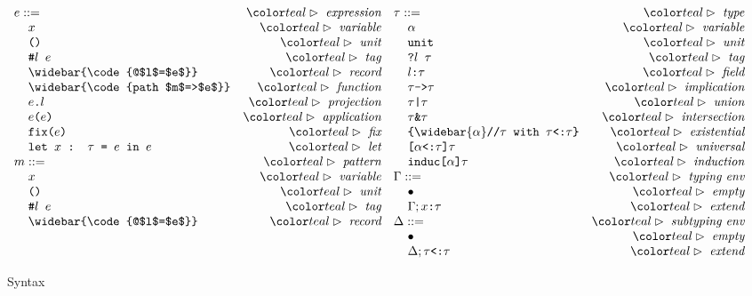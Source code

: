 \documentclass[acmsmall]{acmart}
\begin{document}
\begin{figure*}[h]
\[
\begin{array}[t]{l r}
  e ::= &\C{expression}
  \\
  \I \code{$x$} &\C{variable}
  \\
  \I \code{()} &\C{unit}
  \\
  \I \code{\#$l$ $e$}  &\C{tag}
  \\
  \I \widebar{\code{@$l$=$e$}} &\C{record}
  \\
  \I \widebar{\code{path $m$=>$e$}} &\C{function}
  \\
  \I \code{$e$.$l$} &\C{projection}
  \\
  \I \code{$e$($e$)} &\C{application}
  \\
  \I \code{fix($e$)} &\C{fix}
  \\
  \I \code{let $x$ : $\tau$ = $e$ in $e$}  &\C{let}
  \\
m ::= &\C{pattern}
  \\
  \I \code{$x$} &\C{variable}
  \\
  \I \code{()} &\C{unit}
  \\
  \I \code{\#$l$ $e$}  &\C{tag}
  \\
  \I \widebar{\code{@$l$=$e$}} &\C{record}
\end{array}
\begin{array}[t]{l r}
\tau ::= &\C{type}
  \\
  \I \code{$\alpha$}  &\C{variable}
  \\
  \I \code{unit} &\C{unit}
  \\
  \I \code{?$l$ $\tau$} &\C{tag}
  \\
  \I \code{$l$:$\tau$} &\C{field}
  \\
  \I \code{$\tau$->$\tau$} &\C{implication}
  \\
  \I \code{$\tau$|$\tau$} &\C{union}
  \\
  \I \code{$\tau$\&$\tau$} &\C{intersection}
  \\
  \I \code{\{$\widebar{\alpha}$//$\tau$ with $\tau$<:$\tau$\}} &\C{existential}
  \\
  \I \code{[$\alpha$<:$\tau$]$\tau$} &\C{universal}
  \\
  \I \code{induc[$\alpha$]$\tau$} &\C{induction}
  \\
  \Gamma ::= &\C{typing env}
  \\
  \I \bullet  &\C{empty}
  \\
  \I \Gamma; \code{$x$:$\tau$} &\C{extend}
  \\
  \Delta ::= &\C{subtyping env}
  \\
  \I \bullet &\C{empty}
  \\
  \I \Delta; \code{$\tau$<:$\tau$} &\C{extend}
\end{array}
\]

\caption{Syntax}
\label{fig:syntax}
\end{figure*}
\end{document}

